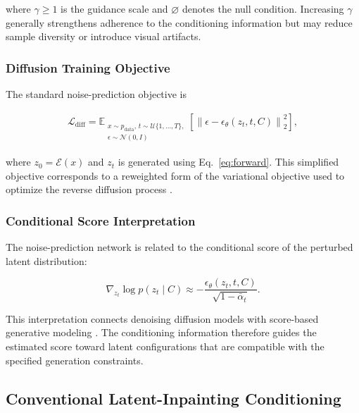 \documentclass[journal]{IEEEtran}
\begin{document}
where \(\gamma\geq1\) is the guidance scale and \(\varnothing\)
denotes the null condition. Increasing \(\gamma\) generally strengthens
adherence to the conditioning information but may reduce sample
diversity or introduce visual artifacts.


\subsubsection{Diffusion Training Objective}

The standard noise-prediction objective is

\begin{equation}
\begin{aligned}
\mathcal{L}_{\mathrm{diff}}
=
\mathbb{E}_{
\substack{
x\sim p_{\mathrm{data}},\,
t\sim\mathcal{U}\{1,\ldots,T\},\\
\epsilon\sim\mathcal{N}(0,I)
}
}
\left[
\left\|
\epsilon-
\epsilon_\theta(z_t,t,C)
\right\|_2^2
\right],
\end{aligned}
\label{eq:loss_diff}
\end{equation}

where \(z_0=\mathcal{E}(x)\) and \(z_t\) is generated using
Eq.~\eqref{eq:forward}. This simplified objective corresponds to a
reweighted form of the variational objective used to optimize the
reverse diffusion process
\cite{ho2020denoisingdiffusionprobabilisticmodels}.


\subsubsection{Conditional Score Interpretation}

The noise-prediction network is related to the conditional score of the
perturbed latent distribution:

\begin{equation}
\nabla_{z_t}
\log p(z_t\mid C)
\approx
-
\frac{
\epsilon_\theta(z_t,t,C)
}{
\sqrt{1-\bar{\alpha}_t}
}.
\label{eq:conditional_score}
\end{equation}

This interpretation connects denoising diffusion models with
score-based generative modeling
\cite{song2021scorebasedgenerativemodelingstochastic}. The conditioning information therefore guides the
estimated score toward latent configurations that are compatible with
the specified generation constraints.


\subsection{Conventional Latent-Inpainting Conditioning}
\label{subsec:flat_conditioning}
\end{document}
